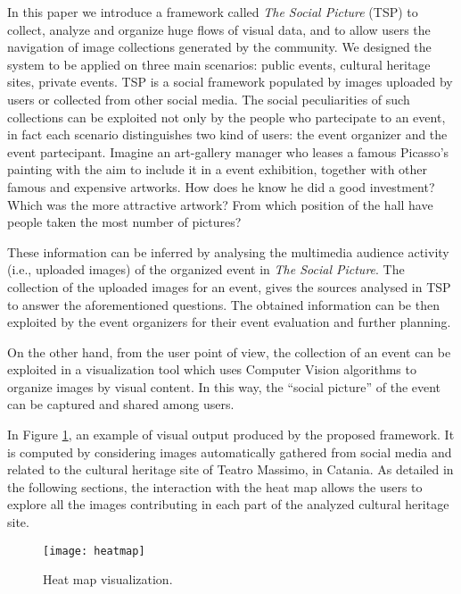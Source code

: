 In this paper we introduce a framework called \textit{The Social Picture} (TSP) to collect, analyze and organize huge flows of visual data, and to allow users the navigation of image collections generated by the community.
We designed the system to be applied on three main scenarios: public events, cultural heritage sites, private events. TSP is a social framework populated by images uploaded by users or collected from other social media. The social peculiarities of such collections can be exploited not only by the people who partecipate to an event, in fact each scenario distinguishes two kind of users: the event organizer and the event partecipant.
Imagine an art-gallery manager who leases a famous Picasso's painting with the aim to include it in a event exhibition, together with other famous and expensive artworks. How does he know he did a good investment? Which was the more attractive artwork? From which position of the hall have people taken the most number of pictures?

These information can be inferred by analysing the multimedia audience activity (i.e., uploaded images) of the organized event in \textit{The Social Picture}. The collection of the uploaded images for an event, gives the sources analysed in TSP to answer the aforementioned questions. The obtained information can be then exploited by the event organizers for their event evaluation and further planning.

On the other hand, from the user point of view, the collection of an event can be exploited in a visualization tool which uses Computer Vision algorithms to organize images by visual content. In this way, the ``social picture'' of the event can be captured and shared among users.

In Figure \ref{heatmap}, an example of visual output produced by the proposed framework. It is computed by considering images automatically gathered from social media and related to the cultural heritage site of Teatro Massimo, in Catania. As detailed in the following sections, the interaction with the heat map allows the users to explore all the images contributing in each part of the analyzed cultural heritage site.
\begin{figure}
	\centering
	\texttt{[image: heatmap]}
	\caption{Heat map visualization.}
	\label{heatmap}
\end{figure}

